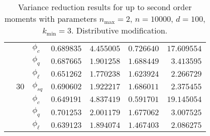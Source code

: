 \begin{table}[htb]
{\begin{tabular}{l@{\hskip 12pt}l@{\hskip 12pt}l@{\hskip 12pt}r@{\hskip 12pt}r@{\hskip 12pt}r@{\hskip 12pt}r}
            &    &$\phi_{c}$ &  $0.689835$ &  $4.455005$ &    $0.726640$ &  $17.609554$ \\
            &    &$\phi_{q}$ &  $0.687665$ &  $1.901258$ &    $1.688449$ &   $3.413595$ \\
            &    &$\phi_{\ell}$ &  $0.651262$ &  $1.770238$ &    $1.623924$ &   $2.266729$ \\\cmidrule{2-7}
            & $30$ &$\phi_{sq}$ &  $0.690602$ &  $1.922217$ &    $1.686011$ &   $2.375455$ \\
            &    &$\phi_{c}$ &  $0.649191$ &  $4.837419$ &    $0.591701$ &  $19.145054$ \\
            &    &$\phi_{q}$ &  $0.701253$ &  $2.001179$ &    $1.677062$ &   $3.007525$ \\
            &    &$\phi_{\ell}$ &  $0.639123$ &  $1.894074$ &    $1.467403$ &   $2.086275$ \\
\bottomrule
\end{tabular}}
    \caption[Variance reduction results for up to second order moments]{Variance reduction results for up to second order moments with parameters $n_{\max}=2$, $n=\num{10000}$, $d=100$, $k_{\min}=3$. Distributive modification.}
    \label{tab:eff2}
\end{table}

